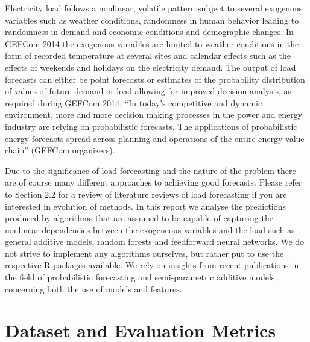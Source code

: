 \documentclass[conference]{IEEEtran}
\begin{document}
Electricity load follows a nonlinear, volatile pattern subject to several exogenous variables such as weather conditions, randomness in human behavior leading to randomness in demand and economic conditions and demographic changes. In GEFCom 2014 the exogenous variables are limited to weather conditions in the form of recorded temperature at several sites and calendar effects such as the effects of weekends and holidays on the electricity demand. The output of load forecasts can either be point forecasts or estimates of the probability distribution of values of future demand or load allowing for improved decision analysis, as required during GEFCom 2014. ``In today's competitive and dynamic environment, more and more decision making processes in the power and energy industry are relying on probabilistic forecasts. The applications of probabilistic energy forecasts spread across planning and operations of the entire energy value chain'' (GEFCom organizers).\par
Due to the significance of load forecasting and the nature of the problem there are of course many different approaches to achieving good forecasts. Please refer to \cite{HongThesis} Section 2.2 for a review of literature reviews of load forecasting if you are interested in evolution of methods.
In this report we analyse the predictions produced by algorithms that are assumed to be capable of capturing the nonlinear dependencies between the exogeneous variables and the load such as general additive models, random forests and feedforward neural networks. We do not strive to implement any algorithms ourselves, but rather put to use the respective R packages available. We rely on insights from recent publications in the field of probabilistic forecasting \cite{Hong2014Gefcom2012} and semi-parametric  additive models \cite{FanHyndman2012}, \cite{Nedellec2014} concerning both the use of models and features. 

\section{Dataset and Evaluation Metrics}
\end{document}
